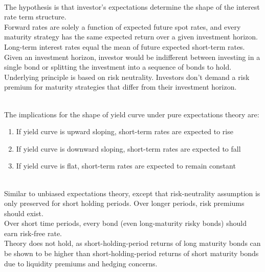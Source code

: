 \begin{remark} \\
The hypothesis is that investor's expectations determine the shape of the interest rate term structure.\\
Forward rates are solely a function of expected future spot rates, and every maturity strategy has the same expected return over a given investment horizon.\\
Long-term interest rates equal the mean of future expected short-term rates.\\
Given an investment horizon, investor would be indifferent between investing in a single bond or splitting the investment into a sequence of bonds to hold.\\
Underlying principle is based on risk neutrality. Investors don't demand a risk premium for maturity strategies that differ from their investment horizon.
\end{remark}

\begin{remark} \\
The implications for the shape of yield curve under pure expectations theory are:
\begin{enumerate}[label=\roman*.]
\setlength{\itemsep}{0pt}
\item If yield curve is upward sloping, short-term rates are expected to rise
\item If yield curve is downward sloping, short-term rates are expected to fall
\item If yield curve is flat, short-term rates are expected to remain constant
\end{enumerate}
\end{remark}

\begin{remark} \\
Similar to unbiased expectations theory, except that risk-neutrality assumption is only preserved for short holding periods. Over longer periods, risk premiums should exist.\\
Over short time periods, every bond (even long-maturity risky bonds) should earn risk-free rate.\\
Theory does not hold, as short-holding-period returns of long maturity bonds can be shown to be higher than short-holding-period returns of short maturity bonds due to liquidity premiums and hedging concerns.
\end{remark}

